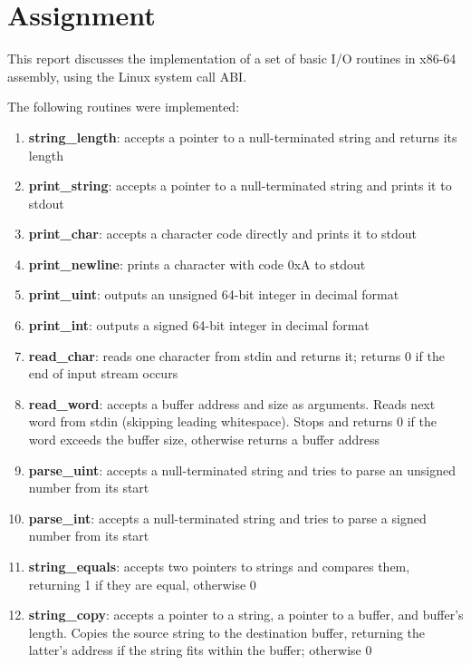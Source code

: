 \documentclass[en, listings]{labreport}
\begin{document}
\maketitlepage

\section*{Assignment}

This report discusses the implementation of a set of basic I/O routines in x86-64 assembly, using the Linux system call ABI.

The following routines were implemented:

\begin{enumerate}
\setlength\itemsep{0.2em}
\item \textbf{string\_length}: accepts a pointer to a null-terminated string and returns its length
\item \textbf{print\_string}: accepts a pointer to a null-terminated string and prints it to stdout
\item \textbf{print\_char}: accepts a character code directly and prints it to stdout
\item \textbf{print\_newline}: prints a character with code 0xA to stdout
\item \textbf{print\_uint}: outputs an unsigned 64-bit integer in decimal format
\item \textbf{print\_int}: outputs a signed 64-bit integer in decimal format
\item \textbf{read\_char}: reads one character from stdin and returns it; returns 0 if the end of input stream occurs
\item \textbf{read\_word}: accepts a buffer address and size as arguments. Reads next word from stdin (skipping leading whitespace). Stops and returns 0 if the word exceeds the buffer size, otherwise returns a buffer address
\item \textbf{parse\_uint}: accepts a null-terminated string and tries to parse an unsigned number from its start
\item \textbf{parse\_int}: accepts a null-terminated string and tries to parse a signed number from its start
\item \textbf{string\_equals}: accepts two pointers to strings and compares them, returning 1 if they are equal, otherwise 0
\item \textbf{string\_copy}: accepts a pointer to a string, a pointer to a buffer, and buffer’s length. Copies the source string to the destination buffer, returning the latter's address if the string fits within the buffer; otherwise 0
\end{enumerate}
\end{document}
